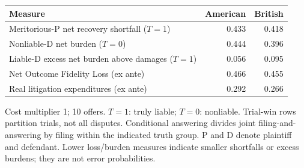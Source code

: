 \noindent\begin{tabularx}{\linewidth}{@{}>{\raggedright\arraybackslash}Xrr@{}}
\toprule
\textbf{Measure} & \textbf{American} & \textbf{British} \\
\midrule
Meritorious-P net recovery shortfall ($T=1$) & 0.433 & 0.418 \\
Nonliable-D net burden ($T=0$) & 0.444 & 0.396 \\
Liable-D excess net burden above damages ($T=1$) & 0.056 & 0.095 \\
Net Outcome Fidelity Loss (ex ante) & 0.466 & 0.455 \\
Real litigation expenditures (ex ante) & 0.292 & 0.266 \\
\bottomrule\end{tabularx}\par\medskip
{\footnotesize\noindent Cost multiplier 1; 10 offers. $T=1$: truly liable; $T=0$: nonliable. Trial-win rows partition trials, not all disputes. Conditional answering divides joint filing-and-answering by filing within the indicated truth group. P and D denote plaintiff and defendant. Lower loss/burden measures indicate smaller shortfalls or excess burdens; they are not error probabilities.\par}
\endgroup
